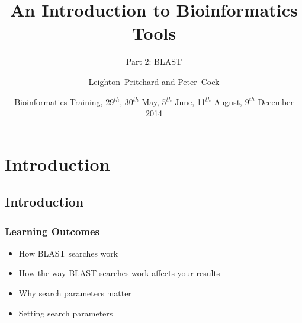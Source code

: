 %




\title[Intro to Bioinformatics] %
{An Introduction to Bioinformatics Tools}
\subtitle{Part 2: BLAST}
\author[Pritchard, Cock] %
{Leighton~Pritchard and Peter~Cock}
\date[May, June, August, December 2014] %
{Bioinformatics Training, 29$^{th}$, 30$^{th}$ May, 5$^{th}$ June, 11$^{th}$ August, $9^{th}$ December 2014}
\subject{Bioinformatics}





\frame[plain]{\titlepage}

\section{Introduction}
\subsection{Introduction}
\begin{frame}
  \frametitle{Learning Outcomes}
  \begin{itemize}
    \item How BLAST searches work
    \item How the way BLAST searches work affects your results
    \item Why search parameters matter
    \item Setting search parameters
 \end{itemize}
\end{frame}    
  
%
%

